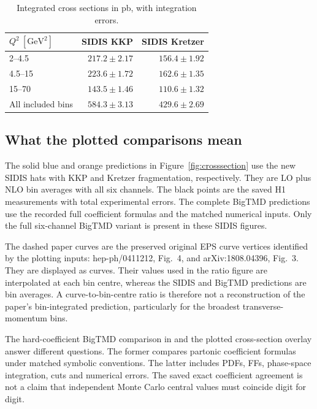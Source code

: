 \documentclass[11pt,a4paper]{article}
\newcommand{\GeV}{\mathrm{GeV}}
\begin{document}
\begin{table}[htbp]
\centering
\caption{Integrated cross sections in pb, with integration errors.\label{tab:integrals}}
\begin{tabular}{@{}lrr@{}}
\toprule
$Q^2\ [\GeV^2]$ & SIDIS KKP & SIDIS Kretzer\\
\midrule
2--4.5 & $217.2\pm 2.17$ & $156.4\pm 1.92$\\
4.5--15 & $223.6\pm 1.72$ & $162.6\pm 1.35$\\
15--70 & $143.5\pm 1.46$ & $110.6\pm 1.32$\\
\midrule
All included bins & $584.3\pm 3.13$ & $429.6\pm 2.69$\\
\bottomrule
\end{tabular}
\end{table}

\subsection{What the plotted comparisons mean}

The solid blue and orange predictions in Figure~\ref{fig:crosssection}
use the new SIDIS hats with KKP and Kretzer fragmentation, respectively.
They are LO plus NLO bin averages with all six channels. The black
points are the saved H1 measurements with total experimental errors.
The complete BigTMD predictions use the recorded full coefficient
formulas and the matched numerical inputs. Only the full six-channel
BigTMD variant is present in these SIDIS figures.

The dashed paper curves are the preserved original EPS curve vertices
identified by the plotting inputs: hep-ph/0411212, Fig.~4, and
arXiv:1808.04396, Fig.~3. They are displayed as curves. Their values
used in the ratio figure are interpolated at each bin centre, whereas
the SIDIS and BigTMD predictions are bin averages. A curve-to-bin-centre
ratio is therefore not a reconstruction of the paper's bin-integrated
prediction, particularly for the broadest transverse-momentum bins.

The hard-coefficient BigTMD comparison in
 and the plotted cross-section overlay answer
different questions. The former compares partonic coefficient formulas
under matched symbolic conventions. The latter includes PDFs, FFs,
phase-space integration, cuts and numerical errors. The saved exact
coefficient agreement is not a claim that independent Monte Carlo
central values must coincide digit for digit.
\end{document}
